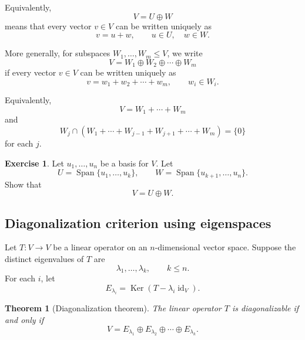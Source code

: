 \documentclass[11pt]{article}
\newcommand{\id}{\operatorname{id}}
\newcommand{\Span}{\operatorname{Span}}
\newcommand{\Ker}{\operatorname{Ker}}
\theoremstyle{definition}
\newtheorem{exercise}[definition]{Exercise}
\theoremstyle{plain}
\newtheorem{theorem}[definition]{Theorem}
\begin{document}
Equivalently,
\[
V=U\oplus W
\]
means that every vector $v\in V$ can be written uniquely as
\[
v=u+w,
\qquad
u\in U,
\quad
w\in W.
\]

More generally, for subspaces $W_1,\dots,W_m\leq V$, we write
\[
V=W_1\oplus W_2\oplus\cdots\oplus W_m
\]
if every vector $v\in V$ can be written uniquely as
\[
v=w_1+w_2+\cdots+w_m,
\qquad
w_i\in W_i.
\]

Equivalently,
\[
V=W_1+\cdots+W_m
\]
and
\[
W_j\cap\left(W_1+\cdots+W_{j-1}+W_{j+1}+\cdots+W_m\right)=\{0\}
\]
for each $j$.

\begin{exercise}
Let $u_1,\dots,u_n$ be a basis for $V$.  Let
\[
U=\Span\{u_1,\dots,u_k\},
\qquad
W=\Span\{u_{k+1},\dots,u_n\}.
\]
Show that
\[
V=U\oplus W.
\]
\end{exercise}

\subsection{Diagonalization criterion using eigenspaces}

Let $T:V\to V$ be a linear operator on an $n$-dimensional vector space.  Suppose the distinct eigenvalues of $T$ are
\[
\lambda_1,\dots,\lambda_k,
\qquad k\leq n.
\]
For each $i$, let
\[
E_{\lambda_i}=\Ker(T-\lambda_i\id_V).
\]

\begin{theorem}[Diagonalization theorem]
The linear operator $T$ is diagonalizable if and only if
\[
V=E_{\lambda_1}\oplus E_{\lambda_2}\oplus\cdots\oplus E_{\lambda_k}.
\]
\end{theorem}
\end{document}

